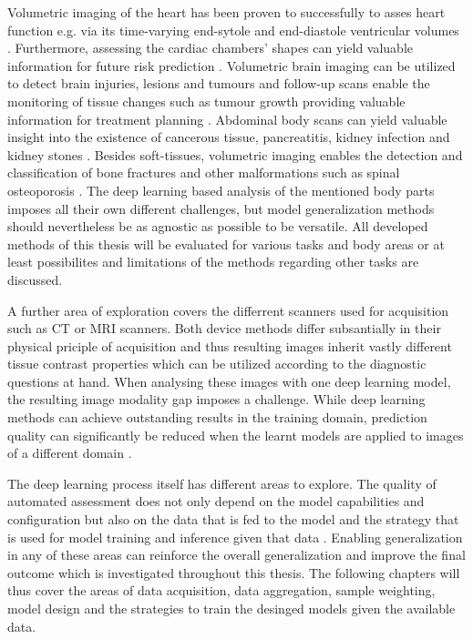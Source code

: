             Volumetric imaging of the heart has been proven to successfully to asses heart function e.g. via its time-varying end-sytole and end-diastole ventricular volumes \citep{xx}. Furthermore, assessing the cardiac chambers' shapes can yield valuable information for future risk prediction \citep{xx}.
            Volumetric brain imaging can be utilized to detect brain injuries, lesions and tumours \citep{xx} and follow-up scans enable the monitoring of tissue changes such as tumour growth providing valuable information for treatment planning \citep{xx}.
            Abdominal body scans can yield valuable insight into the existence of cancerous tissue, pancreatitis, kidney infection and kidney stones
            \citep{xx}.
            Besides soft-tissues, volumetric imaging enables the detection and classification of bone fractures and other malformations such as spinal osteoporosis \citep{xx}.
            The deep learning based analysis of the mentioned body parts imposes all their own different challenges, but model generalization methods should nevertheless be as agnostic as possible to be versatile. All developed methods of this thesis will be evaluated for various tasks and body areas or at least possibilites and limitations of the methods regarding other tasks are discussed.

            A further area of exploration covers the differrent scanners used for acquisition such as CT or MRI scanners. Both device methods differ subsantially in their physical priciple of acquisition and thus resulting images inherit vastly different tissue contrast properties which can be utilized according to the diagnostic questions at hand.
            When analysing these images with one deep learning model, the resulting image modality gap imposes a challenge. While deep learning methods can achieve outstanding results in the training domain, prediction quality can significantly be reduced when the learnt models are applied to images of a different domain \citep{xx}.

            The deep learning process itself has different areas to explore.
            The quality of automated assessment does not only depend on the model capabilities and configuration but also on the data that is fed to the model and the strategy that is used for model training and inference given that data \citep{xx}.
            Enabling generalization in any of these areas can reinforce the overall generalization and improve the final outcome which is investigated throughout this thesis. The following chapters will thus cover the areas of data acquisition, data aggregation, sample weighting, model design and the strategies to train the desinged models given the available data.

